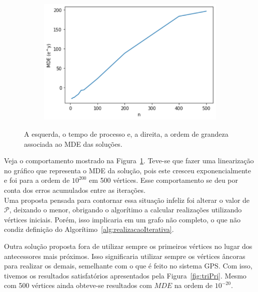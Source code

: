 \documentclass[a4paper,12pt]{report}
\begin{document}
\begin{figure}[H]
\begin{center}
\begin{minipage}{0.45 \linewidth}
				\begin{figure}[H]
					\begin{center}
						\includegraphics[width=1\linewidth]{figures/mdeTri.png}
					\end{center}
				\end{figure}
			\end{minipage}
		\end{center}
		\caption{A esquerda, o tempo de processo e, a direita, a ordem de grandeza associada ao MDE das soluções.}
		\label{fig:tri}
	\end{figure}
	
	Veja o comportamento mostrado na Figura~\ref{fig:tri}. Teve-se que fazer uma linearização no gráfico que representa o MDE da solução, pois este cresceu exponencialmente e foi para a ordem de $10^{200}$ em 500 vértices. Esse comportamento se deu por conta dos erros acumulados entre as iterações.
	\\
	
	Uma proposta pensada para contornar essa situação infeliz foi alterar o valor de $\mathcal{P}$, deixando o menor, obrigando o algorítimo a calcular realizações utilizando vértices iniciais. Porém, isso implicaria em um grafo não completo, o que não condiz definição do Algorítimo~\ref{alg:realizacaoIterativa}.
	
	Outra solução proposta fora de utilizar sempre os primeiros vértices no lugar dos antecessores mais próximos. Isso significaria utilizar sempre os vértices âncoras para realizar os demais, semelhante com o que é feito no sistema GPS. Com isso, tivemos os resultados satisfatórios apresentados pela Figura~\ref{fig:triPri}. Mesmo com 500 vértices ainda obteve-se resultados com $MDE$ na ordem de $10^{-20}$.
	
\end{document}
